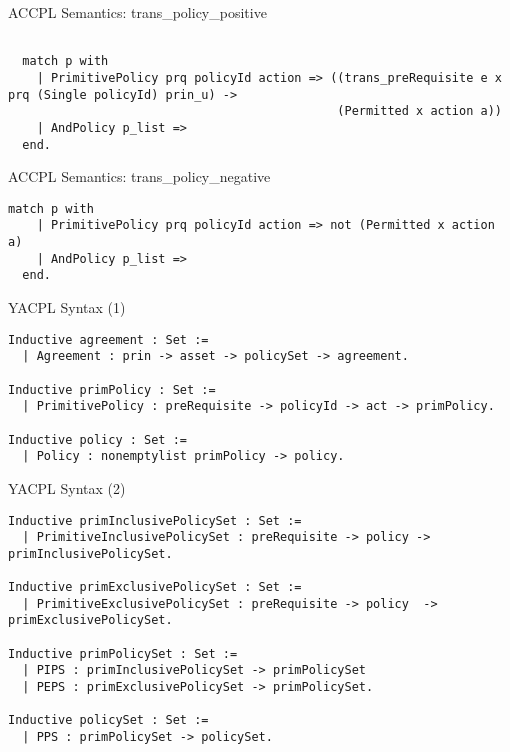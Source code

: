 \documentclass{beamer}
\begin{document}
\begin{frame}[fragile]{ACCPL Semantics: trans\_policy\_positive}
\lstset{language=Coq}
\begin{lstlisting}

  match p with
    | PrimitivePolicy prq policyId action => ((trans_preRequisite e x prq (Single policyId) prin_u) ->
                                              (Permitted x action a))
    | AndPolicy p_list => 
  end.
\end{lstlisting}
\end{frame}

\begin{frame}[fragile]{ACCPL Semantics: trans\_policy\_negative}
\lstset{language=Coq}
\begin{lstlisting}
match p with
    | PrimitivePolicy prq policyId action => not (Permitted x action a)
    | AndPolicy p_list => 
  end.
\end{lstlisting}
\end{frame}
\begin{frame}[fragile]{YACPL Syntax (1)}
\lstset{language=Coq}
\begin{lstlisting}
Inductive agreement : Set :=
  | Agreement : prin -> asset -> policySet -> agreement.

Inductive primPolicy : Set :=
  | PrimitivePolicy : preRequisite -> policyId -> act -> primPolicy.

Inductive policy : Set :=
  | Policy : nonemptylist primPolicy -> policy.
\end{lstlisting}
\end{frame}
\begin{frame}[fragile]{YACPL Syntax (2)}
\lstset{language=Coq}
\begin{lstlisting}
Inductive primInclusivePolicySet : Set :=
  | PrimitiveInclusivePolicySet : preRequisite -> policy -> primInclusivePolicySet.

Inductive primExclusivePolicySet : Set :=
  | PrimitiveExclusivePolicySet : preRequisite -> policy  -> primExclusivePolicySet.

Inductive primPolicySet : Set :=
  | PIPS : primInclusivePolicySet -> primPolicySet
  | PEPS : primExclusivePolicySet -> primPolicySet.

Inductive policySet : Set :=
  | PPS : primPolicySet -> policySet.

\end{lstlisting}
\end{frame}
\end{document}

